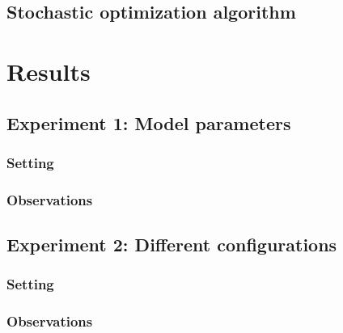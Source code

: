 \documentclass[11pt]{article}
\begin{document}
\subsection{Stochastic optimization algorithm}


\section{Results}

\subsection{Experiment 1: Model parameters}

\subsubsection{Setting} 

\subsubsection{Observations}

\subsection{Experiment 2: Different configurations}

\subsubsection{Setting}

\subsubsection{Observations}
\end{document}
